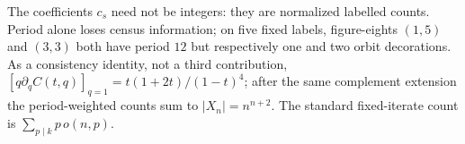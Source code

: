 The coefficients $c_s$ need not be integers: they are normalized labelled
counts. Period alone loses census information; on five fixed labels,
figure-eights $(1,5)$ and $(3,3)$ both have period $12$ but respectively
one and two orbit decorations. As a consistency identity, not a third
contribution,
$[q\partial_q C(t,q)]_{q=1}=t(1+2t)/(1-t)^4$; after the same complement
extension the period-weighted counts sum to $|X_n|=n^{n+2}$.
The standard fixed-iterate count is $\sum_{p\mid k}p\,o(n,p)$.

